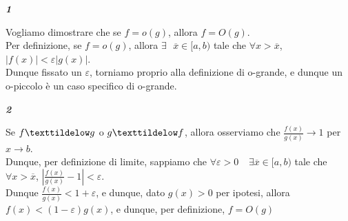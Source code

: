 \documentclass{article}
\theoremstyle{definition}
\begin{document}
\begin{center}
    \textbf{\textit{1}}
\end{center}
Vogliamo dimostrare che se $f=o(g)$, allora $f=O(g)$.
\\
Per definizione, se $f=o(g)$, allora $\exists \,\,\,\, \overline{x} \in [a,b)$ tale che $\forall x > \overline{x}$, $|f(x)| < \varepsilon|g(x)|$.
\\
Dunque fissato un $\varepsilon$, torniamo proprio alla definizione di o-grande, e dunque un o-piccolo è un caso specifico di o-grande.

\begin{center}
    \textbf{\textit{2}}
\end{center}
Se $f \texttildelow g$ o $g \texttildelow f$, allora osserviamo che $\frac{f(x)}{g(x)} \to 1$ per $ x \to b$.
\\
Dunque, per definizione di limite, sappiamo che $\forall \varepsilon > 0 \,\,\,\,\,\ \exists \overline{x} \in [a,b)$ tale che $\forall x > \overline{x}$, $|\frac{f(x)}{g(x)}-1|<\varepsilon$.
\\
Dunque $\frac{f(x)}{g(x)}< 1+ \varepsilon$, e dunque, dato $g(x) > 0$ per ipotesi, allora $f(x) < (1-\varepsilon) g(x)$, e dunque, per definizione, $f=O(g)$
\end{document}
